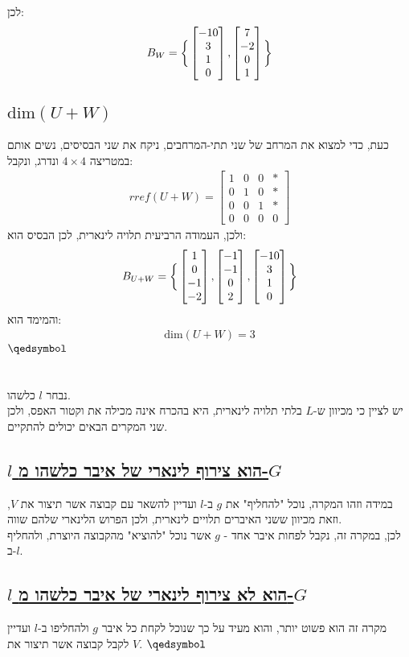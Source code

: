 \documentclass[a4paper, 12pt, leqno]{article}
\newcommand{\sub}[1]{\subsection{\underline{#1}}}
\newcommand{\eq}[1]{\begin{align*}#1\end{align*}}
\newcommand{\bigset}[1]{\bigg{\{} #1 \bigg{\}}}
\renewcommand{\qed}{\hfill\(\qedsymbol\)}
\begin{document}
לכן:
\eq{
    B_W=\bigset{
        \begin{bmatrix}
            -10\\3\\1\\0
        \end{bmatrix}
        ,
        \begin{bmatrix}
            7\\-2\\0\\1
        \end{bmatrix}
    }
}
\sub{$\text{dim}(U+W)$}
כעת, כדי למצוא את המרחב של שני תתי-המרחבים, ניקח את שני הבסיסים, נשים אותם במטריצה $4\times4$ ונדרג, ונקבל:
\eq{
    rref(U+W)=
    \begin{bmatrix}
        1&0&0&*\\
        0&1&0&*\\
        0&0&1&*\\
        0&0&0&0
    \end{bmatrix}
}
ולכן, העמודה הרביעית תלויה לינארית, לכן הבסיס הוא:
\eq{
    B_{U+W}=\bigset{
        \begin{bmatrix}
            1\\0\\-1\\-2
        \end{bmatrix}
        ,
        \begin{bmatrix}
            -1\\-1\\0\\2
        \end{bmatrix}
        ,
        \begin{bmatrix}
            -10\\3\\1\\0
        \end{bmatrix}
    }
}
והמימד הוא:
\eq{
    \text{dim}(U+W)=3
}
\qed

\setcounter{section}{8}
\section{}
נבחר $l$ כלשהו.\\
יש לציין כי מכיוון ש-$L$ בלתי תלויה לינארית, היא בהכרח אינה מכילה את וקטור האפס, ולכן שני המקרים הבאים יכולים להתקיים.
\sub{$l$ הוא צירוף לינארי של איבר כלשהו מ-$G$}
במידה וזהו המקרה, נוכל "להחליף" את $g$ ב-$l$ ועדיין להשאר עם קבוצה אשר תיצור את $V$, וזאת מכיוון ששני האיברים תלויים לינארית, ולכן הפרוש הלינארי שלהם שווה.\\
לכן, במקרה זה, נקבל לפחות איבר אחד - $g$ אשר נוכל "להוציא" מהקבוצה היוצרת, ולהחליף ב-$l$.
\sub{$l$ הוא לא צירוף לינארי של איבר כלשהו מ-$G$}
מקרה זה הוא פשוט יותר, והוא מעיד על כך שנוכל לקחת כל איבר $g$ ולהחליפו ב-$l$ ועדיין לקבל קבוצה אשר תיצור את $V$.
\qed
\end{document}

